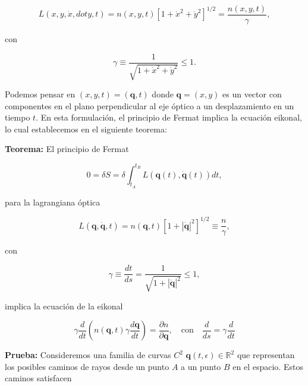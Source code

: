 \documentclass[a4paper,10pt]{article}
\numberwithin{equation}{section}
\newcommand{\teorema}{\textbf{Teorema: }}
\newcommand{\prueba}{\textbf{Prueba: }}
\begin{document}
\begin{equation}
 L(x,y,\dot{x},dot{y},t) = n(x,y,t)\left[1 + \dot{x}^2 + \dot{y}^2 \right]^{1/2} = 
 \frac{n(x,y,t)}{\gamma},
\end{equation}

con 

\begin{equation}
 \gamma \equiv \frac{1}{\sqrt{1 + \dot{x}^2 + \dot{y}^2}} \leq 1.
\end{equation}

Podemos pensar en $(x,y,t) = (\mathbf{q},t)$ donde $\mathbf{q} = (x,y)$ es un vector 
con componentes en el plano perpendicular al eje óptico a un desplazamiento en un 
tiempo $t$. En esta formulación, el principio de Fermat implica la ecuación 
eikonal, lo cual establecemos en el siguiente teorema:

\vspace{.3cm}

\begin{mdframed}[linewidth=2]

\teorema El principio de Fermat

\begin{equation}
 0 = \delta S = \delta \int_{t_A}^{t_B} L(\mathbf{q}(t),\dot{\mathbf{q}}(t))dt, 
\end{equation}

para la lagrangiana óptica 

\begin{equation}
 L(\mathbf{q},\dot{\mathbf{q}},t) = n(\mathbf{q},t)\left[1 + |\dot{\mathbf{q}}|^2
 \right]^{1/2} \equiv \frac{n}{\gamma},
 \label{eq:113}
\end{equation}

con 

\begin{equation}
 \gamma \equiv \frac{dt}{ds} = \frac{1}{\sqrt{1 + |\dot{\mathbf{q}}|^2}} \leq 1,
 \label{eq:114}
\end{equation}

implica la ecuación de la eikonal

\begin{equation}
 \gamma\frac{d}{dt}\left(n(\mathbf{q},t)\gamma\frac{d\mathbf{q}}{dt}\right) 
 = \frac{\partial n}{\partial \mathbf{q}}, \quad \text{con} \quad 
 \frac{d}{ds} = \gamma \frac{d}{dt}
 \label{eq:115}
\end{equation}
\end{mdframed}

\prueba Consideremos una familia de curvas $C^2$ $\mathbf{q}(t,\epsilon) \in \mathbb{R}^2$ 
que representan los posibles caminos de rayos desde un punto $A$ a un punto $B$ en el 
espacio. Estos caminos satisfacen 
\end{document}
